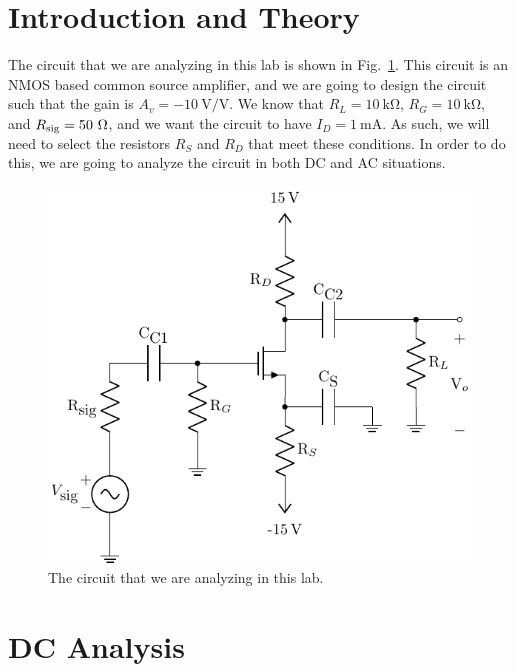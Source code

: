 \documentclass{../../ece-report}
\begin{document}
\maketitle


\section{Introduction and Theory}


The circuit that we are analyzing in this lab is shown
in Fig.~\ref{fig:circuit_full}. This circuit is an NMOS
based common source amplifier, and we are going to design
the circuit such that the gain is $A_v = -10~\si{\V/\V}$.
We know that  $R_L = 10~\si{\kohm}$, $R_G = 10~\si{\kohm}$,
and $R_\textnormal{sig} = 50~\si{\ohm}$, and we want
the circuit to have $I_D = 1~\si{\mA}$. As such, we will need 
to select the resistors $R_S$ and $R_D$ that meet these conditions.
In order to do this, we are going to analyze the circuit
in both DC and AC situations.

\begin{figure}[h!]
  \centering
    \includegraphics{../circuits/circuit_full.pdf}
  \caption{The circuit that we are analyzing in this lab.}\label{fig:circuit_full}
\end{figure}


\section{DC Analysis}
\end{document}
